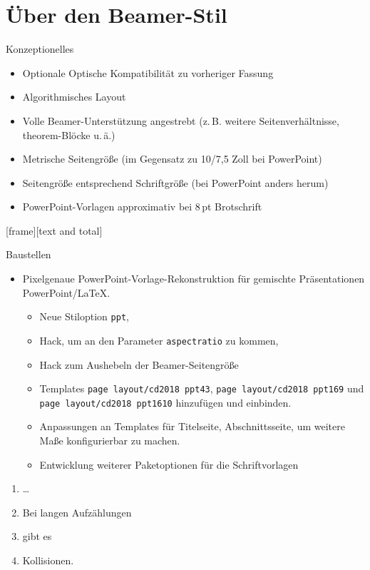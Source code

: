 \section{Über den Beamer-Stil}
\begin{frame}{Konzeptionelles}
  \begin{itemize}
  \item Optionale Optische Kompatibilität zu vorheriger Fassung
  \item<+-> Algorithmisches Layout
  \item<+-> Volle Beamer-Unterstützung angestrebt (z.\,B. weitere Seitenverhältnisse, theorem-Blöcke u.\,ä.)
  \item<+> Metrische Seitengröße (im Gegensatz zu 10/7,5 Zoll bei PowerPoint)
  \item<+> Seitengröße entsprechend Schriftgröße (bei PowerPoint anders herum)
  \item<+-> PowerPoint-Vorlagen approximativ bei 8\,pt Brotschrift
  \end{itemize}
\end{frame}
[frame][text and total]
\begin{frame}{Baustellen}\label{baustellen}
  \begin{itemize}
  \item Pixelgenaue PowerPoint-Vorlage-Rekonstruktion für gemischte Präsentationen PowerPoint/\LaTeX.
    \begin{itemize}
    \item Neue Stiloption \texttt{ppt},
    \item Hack, um an den Parameter \texttt{aspectratio} zu kommen,
    \item Hack zum Aushebeln der Beamer-Seitengröße
    \item Templates \texttt{page layout/cd2018 ppt43}, \texttt{page
        layout/cd2018 ppt169} und \texttt{page layout/cd2018 ppt1610}
      hinzufügen und einbinden.
    \item Anpassungen an Templates für Titelseite, Abschnittsseite, um
      weitere Maße konfigurierbar zu machen.
    \item Entwicklung weiterer Paketoptionen für die Schriftvorlagen
    \end{itemize}
  \end{itemize}
  \begin{enumerate}
  \item \dots\setcounter{enumi}{8}
  \item Bei langen Aufzählungen
  \item gibt es
  \item Kollisionen.
  \end{enumerate}
\end{frame}

